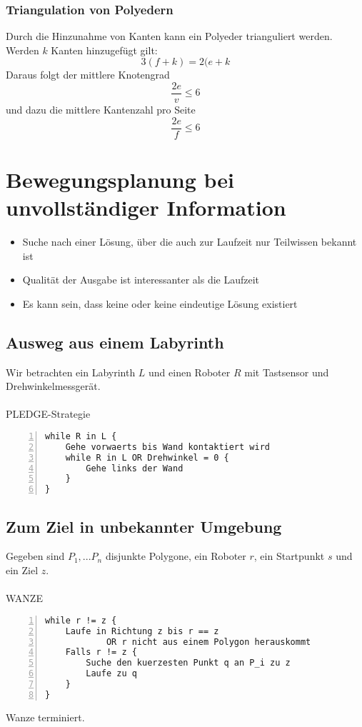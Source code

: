 \subsubsection{Triangulation von Polyedern}
Durch die Hinzunahme von Kanten kann ein Polyeder trianguliert werden. Werden \(k\) Kanten hinzugefügt gilt:
\[3(f+k) = 2(e+k\]
Daraus folgt der mittlere Knotengrad
\[\frac{2e}{v} \leq 6\]
und dazu die mittlere Kantenzahl pro Seite
\[\frac{2e}{f} \leq 6\]



\section{Bewegungsplanung bei unvollständiger Information}
\begin{itemize}
	\item Suche nach einer Lösung, über die auch zur Laufzeit nur Teilwissen bekannt ist
	\item Qualität der Ausgabe ist interessanter als die Laufzeit
	\item Es kann sein, dass keine oder keine eindeutige Lösung existiert
\end{itemize}


\subsection{Ausweg aus einem Labyrinth}
Wir betrachten ein Labyrinth \(L\) und einen Roboter \(R\) mit Tastsensor und Drehwinkelmessgerät.
\\\\
PLEDGE-Strategie
\begin{lstlisting}[frame=single,numbers=left]
while R in L {
	Gehe vorwaerts bis Wand kontaktiert wird
	while R in L OR Drehwinkel = 0 {
		Gehe links der Wand
	}
}
\end{lstlisting}


\subsection{Zum Ziel in unbekannter Umgebung}
Gegeben sind \(P_1,...P_n\) disjunkte Polygone, ein Roboter \(r\), ein Startpunkt \(s\) und ein Ziel \(z\).
\\\\
WANZE
\begin{lstlisting}[frame=single,numbers=left]
while r != z {
	Laufe in Richtung z bis r == z
			OR r nicht aus einem Polygon herauskommt
	Falls r != z {
		Suche den kuerzesten Punkt q an P_i zu z
		Laufe zu q
	}
}
\end{lstlisting}
Wanze terminiert.

